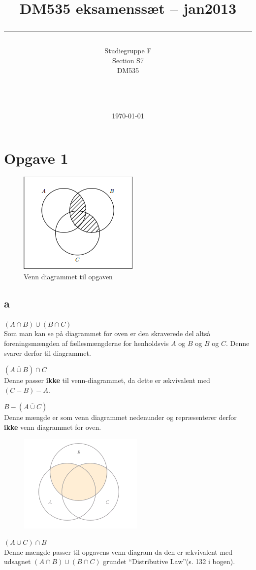 \documentclass[a4paper,10pt]{article}
\title{DM535 eksamenssæt -- jan2013 \\ \rule{10cm}{0.5mm}}
\author{Studiegruppe F \\ Section S7 \\
DM535\\\rule{5.5cm}{0.5mm}\\}
\date{\today}
\begin{document}
\maketitle
\vfill
\tableofcontents
\newpage
\section{Opgave 1}
\begin{figure}[h]
\center
\caption{Venn diagrammet til opgaven}
\includegraphics[scale=0.5]{venn-jan13}
\end{figure}
\subsection{a}
\begin{description}
    \item $(A \cap B) \cup (B \cap C)$ \hfill \\
        Som man kan se på diagrammet for oven er den skraverede del altså
        foreningsmængden af fællesmængderne for henholdsvis $A$ og $B$ og $B$
        og $C$. Denne svarer derfor til diagrammet.
    \item $(\overline{A \cup B}) \cap C$ \hfill \\
        Denne passer \textbf{ikke} til venn-diagrammet, da dette er ækvivalent
        med $ (C - B) - A$.
    \item $B - (\overline{A \cup C})$ \hfill \\
        Denne mængde er som venn diagrammet nedenunder og repræsenterer derfor
        \textbf{ikke} venn diagrammet for oven.
        \begin{figure}[h]
        \center
        \includegraphics[scale=0.5]{venn2-jan13}
        \end{figure}
    \item $(A \cup C) \cap B$ \hfill \\
        Denne mængde passer til opgavens venn-diagram da den er ækvivalent med
        udsagnet $(A \cap B) \cup (B \cap C)$ grundet ``Distributive Law''(s.
        132 i bogen).
\end{description}
\end{document}
